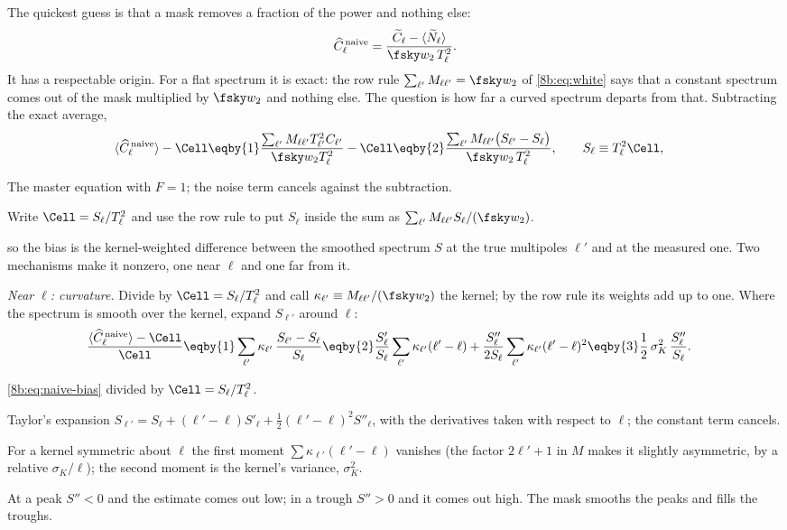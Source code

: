 The quickest guess is that a mask removes a fraction of the power and nothing else:
\begin{equation}
  \widehat C^{\,\rm naive}_\ell=\frac{\widetilde C_\ell-\langle\widetilde N_\ell\rangle}{\fsky w_2\,T_\ell^2} .
  \label{8b:eq:naive}
\end{equation}
It has a respectable origin. For a flat spectrum it is exact: the row rule
$\sum_{\ell'}M_{\ell\ell'}=\fsky w_2$ of \eqref{8b:eq:white} says that a constant spectrum comes out of
the mask multiplied by $\fsky w_2$ and nothing else. The question is how far a curved spectrum
departs from that. Subtracting the exact average,
\begin{align}
  \langle\widehat C^{\,\rm naive}_\ell\rangle-\Cell
  &\eqby{1}\frac{\sum_{\ell'}M_{\ell\ell'}T_{\ell'}^2C_{\ell'}}{\fsky w_2T_\ell^2}-\Cell
   \eqby{2}\frac{\sum_{\ell'}M_{\ell\ell'}\bigl(S_{\ell'}-S_\ell\bigr)}{\fsky w_2\,T_\ell^2},
   \qquad S_\ell\equiv T_\ell^2\Cell ,
  \label{8b:eq:naive-bias}
\end{align}
\begin{explain}
  \item The master equation with $F=1$; the noise term cancels against the subtraction.
  \item Write $\Cell=S_\ell/T_\ell^2$ and use the row rule to put $S_\ell$ inside the sum as
        $\sum_{\ell'}M_{\ell\ell'}S_\ell/(\fsky w_2)$.
\end{explain}
so the bias is the kernel-weighted difference between the smoothed spectrum $S$ at the true
multipoles $\ell'$ and at the measured one. Two mechanisms make it nonzero, one near $\ell$ and one far
from it.

\emph{Near $\ell$: curvature.} Divide by $\Cell=S_\ell/T_\ell^2$ and call $\kappa_{\ell'}\equiv M_{\ell\ell'}/(\fsky w_2)$ the
kernel; by the row rule its weights add up to one. Where the spectrum is smooth over the kernel,
expand $S_{\ell'}$ around $\ell$:
\begin{align*}
  \frac{\langle\widehat C^{\,\rm naive}_\ell\rangle-\Cell}{\Cell}
  &\eqby{1}\sum_{\ell'}\kappa_{\ell'}\,\frac{S_{\ell'}-S_\ell}{S_\ell}
   \eqby{2}\frac{S'_\ell}{S_\ell}\sum_{\ell'}\kappa_{\ell'}(\ell'-\ell)
    +\frac{S''_\ell}{2S_\ell}\sum_{\ell'}\kappa_{\ell'}(\ell'-\ell)^2
   \eqby{3}\frac12\,\sigma_K^2\,\frac{S''_\ell}{S_\ell} .
\end{align*}
\begin{explain}
  \item \eqref{8b:eq:naive-bias} divided by $\Cell=S_\ell/T_\ell^2$.
  \item Taylor's expansion $S_{\ell'}=S_\ell+(\ell'-\ell)S'_\ell+\tfrac12(\ell'-\ell)^2S''_\ell$, with the derivatives taken
        with respect to $\ell$; the constant term cancels.
  \item For a kernel symmetric about $\ell$ the first moment $\sum\kappa_{\ell'}(\ell'-\ell)$ vanishes (the factor
        $2\ell'+1$ in $M$ makes it slightly asymmetric, by a relative $\sigma_K/\ell$); the second moment is the
        kernel's variance, $\sigma_K^2$.
\end{explain}
At a peak $S''<0$ and the estimate comes out low; in a trough $S''>0$ and it comes out high. The mask
smooths the peaks and fills the troughs.

